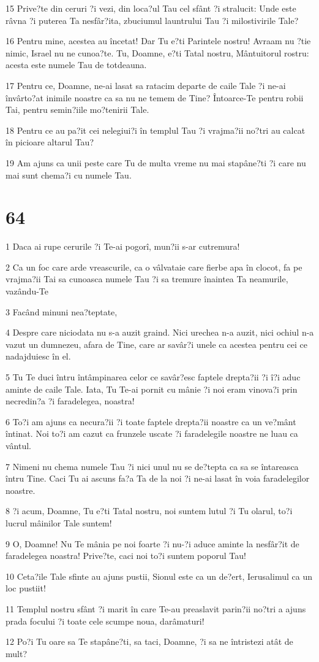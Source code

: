 \par 15 Prive?te din ceruri ?i vezi, din loca?ul Tau cel sfânt ?i stralucit: Unde este râvna ?i puterea Ta nesfâr?ita, zbuciumul launtrului Tau ?i milostivirile Tale?
\par 16 Pentru mine, acestea au încetat! Dar Tu e?ti Parintele nostru! Avraam nu ?tie nimic, Israel nu ne cunoa?te. Tu, Doamne, e?ti Tatal nostru, Mântuitorul rostru: acesta este numele Tau de totdeauna.
\par 17 Pentru ce, Doamne, ne-ai lasat sa ratacim departe de caile Tale ?i ne-ai învârto?at inimile noastre ca sa nu ne temem de Tine? Întoarce-Te pentru robii Tai, pentru semin?iile mo?tenirii Tale.
\par 18 Pentru ce au pa?it cei nelegiui?i în templul Tau ?i vrajma?ii no?tri au calcat în picioare altarul Tau?
\par 19 Am ajuns ca unii peste care Tu de multa vreme nu mai stapâne?ti ?i care nu mai sunt chema?i cu numele Tau.

\chapter{64}

\par 1 Daca ai rupe cerurile ?i Te-ai pogorî, mun?ii s-ar cutremura!
\par 2 Ca un foc care arde vreascurile, ca o vâlvataie care fierbe apa în clocot, fa pe vrajma?ii Tai sa cunoasca numele Tau ?i sa tremure înaintea Ta neamurile, vazându-Te
\par 3 Facând minuni nea?teptate,
\par 4 Despre care niciodata nu s-a auzit graind. Nici urechea n-a auzit, nici ochiul n-a vazut un dumnezeu, afara de Tine, care ar savâr?i unele ca acestea pentru cei ce nadajduiesc în el.
\par 5 Tu Te duci întru întâmpinarea celor ce savâr?esc faptele drepta?ii ?i î?i aduc aminte de caile Tale. Iata, Tu Te-ai pornit cu mânie ?i noi eram vinova?i prin necredin?a ?i faradelegea, noastra!
\par 6 To?i am ajuns ca necura?ii ?i toate faptele drepta?ii noastre ca un ve?mânt întinat. Noi to?i am cazut ca frunzele uscate ?i faradelegile noastre ne luau ca vântul.
\par 7 Nimeni nu chema numele Tau ?i nici unul nu se de?tepta ca sa se întareasca întru Tine. Caci Tu ai ascuns fa?a Ta de la noi ?i ne-ai lasat în voia faradelegilor noastre.
\par 8 ?i acum, Doamne, Tu e?ti Tatal nostru, noi suntem lutul ?i Tu olarul, to?i lucrul mâinilor Tale suntem!
\par 9 O, Doamne! Nu Te mânia pe noi foarte ?i nu-?i aduce aminte la nesfâr?it de faradelegea noastra! Prive?te, caci noi to?i suntem poporul Tau!
\par 10 Ceta?ile Tale sfinte au ajuns pustii, Sionul este ca un de?ert, Ierusalimul ca un loc pustiit!
\par 11 Templul nostru sfânt ?i marit în care Te-au preaslavit parin?ii no?tri a ajuns prada focului ?i toate cele scumpe noua, darâmaturi!
\par 12 Po?i Tu oare sa Te stapâne?ti, sa taci, Doamne, ?i sa ne întristezi atât de mult?

